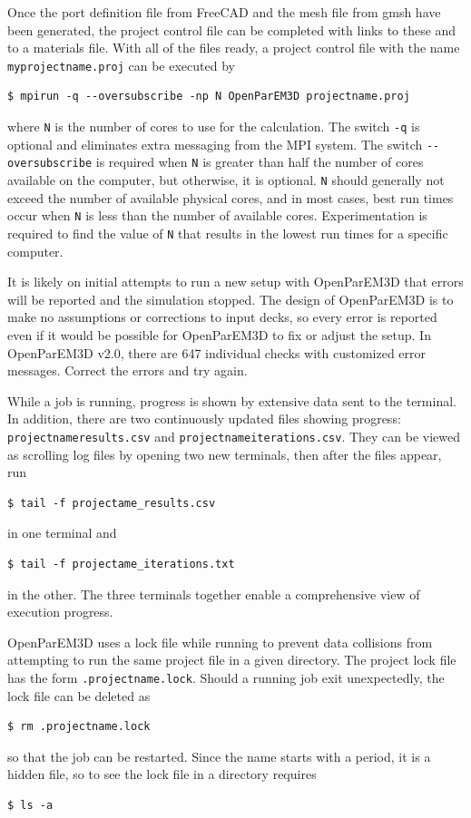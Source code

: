 \documentclass[titlepage]{article}
\renewcommand\_{\textunderscore\linebreak[1]}
\begin{document}
Once the port definition file from FreeCAD and the mesh file from gmsh have been generated, the project control file can be completed with links to these and to a materials file.  With all of the files ready, a project control file with the name \texttt{my\_projectname.proj} can be executed by 
\begin{Verbatim}[fontsize=\small]
   $ mpirun -q --oversubscribe -np N OpenParEM3D projectname.proj
\end{Verbatim}
where \verb+N+ is the number of cores to use for the calculation.  The switch \verb+-q+ is optional and eliminates extra messaging from the MPI system.  The switch \verb+--oversubscribe+ is required when \verb+N+ is greater than half the number of cores available on the computer, but otherwise, it is optional.  \verb+N+ should generally not exceed the number of available physical cores, and in most cases, best run times occur when \verb+N+ is less than the number of available cores.  Experimentation is required to find the value of \verb+N+ that results in the lowest run times for a specific computer.

It is likely on initial attempts to run a new setup with OpenParEM3D that errors will be reported and the simulation stopped.  The design of OpenParEM3D is to make no assumptions or corrections to input decks, so every error is reported even if it would be possible for OpenParEM3D to fix or adjust the setup.  In OpenParEM3D v2.0, there are 647 individual checks with customized error messages.  Correct the errors and try again.

While a job is running, progress is shown by extensive data sent to the terminal.  In addition,
there are two continuously updated files showing progress: \texttt{projectname\_results.csv} and \texttt{projectname\_iterations.csv}.  They can be viewed as scrolling log files by opening two new terminals, then after the files appear, run
\begin{Verbatim}[fontsize=\small]
   $ tail -f projectame_results.csv
\end{Verbatim}
\noindent in one terminal and
\begin{Verbatim}[fontsize=\small]
   $ tail -f projectame_iterations.txt
\end{Verbatim}
\noindent in the other.  The three terminals together enable a comprehensive view of execution progress.

OpenParEM3D uses a lock file while running to prevent data collisions from attempting to run the same project file in a given directory.  The project lock file has the form \texttt{.projectname.lock}.  Should a running job exit unexpectedly, the lock file can be deleted as
\begin{Verbatim}[fontsize=\small]
   $ rm .projectname.lock
\end{Verbatim}
\noindent so that the job can be restarted.  Since the name starts with a period, it is a hidden file, so to see the lock file in a directory requires
\begin{Verbatim}[fontsize=\small]
   $ ls -a
\end{Verbatim}
\end{document}

